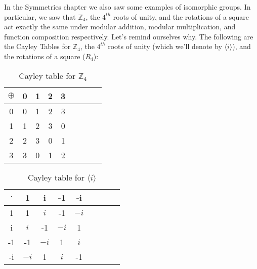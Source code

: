 


\begin{example}\label{example:isomorph:sym_ex}
In the Symmetries chapter we also saw some  examples of isomorphic groups.  In particular, we saw that ${\mathbb Z_4}$, the $4^{th}$ roots of unity, and the rotations of a square act exactly the same under modular addition, modular multiplication, and function composition respectively. Let's remind ourselves why. 
The following are the Cayley Tables for ${\mathbb Z_4}$, the $4^{th}$ roots of unity (which we'll denote by $\langle i \rangle$), and the rotations of a square ($R_4$):

\begin{table}[H]
\caption{Cayley table for ${\mathbb Z}_4$}
\label{Z4_add_table}
{\small
\begin{center}
\begin{tabular}{c|cccccccc}
$\oplus$ & 0 & 1 & 2 & 3  \\
\hline
0        & 0 & 1 & 2 & 3  \\
1       & 1 & 2 & 3 & 0  \\
2       & 2 & 3 & 0 & 1 \\
3       & 3 & 0 & 1 & 2 \\

\end{tabular}
\end{center}
}
\end{table}

\begin{table}[H]
\caption{Cayley table for $\langle i \rangle$}
\label{4_roots_table}
{\small
\begin{center}
\begin{tabular}{c|cccccccc}
$\cdot$ & 1 & i & -1 & -i  \\
\hline
1        & 1 &$i$ & -1 &$-i$  \\
i       &$i$ & -1 & $-i$ & 1  \\
-1       & -1 & $-i$ & 1 & $i$ \\
-i       & $-i$ & 1 & $i$ & -1 \\


\end{tabular}
\end{center}}
\end{table}
\end{example}
